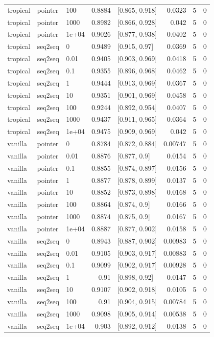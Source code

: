 \documentclass[10pt]{article}
\begin{document}
{\begin{longtable}{lllrlrrr}
tropical & pointer & 100 & 0.8884 & [0.865, 0.918] & 0.0323 & 5 & 0\\
tropical & pointer & 1000 & 0.8982 & [0.866, 0.928] & 0.042 & 5 & 0\\
tropical & pointer & 1e+04 & 0.9026 & [0.877, 0.938] & 0.0402 & 5 & 0\\
tropical & seq2seq & 0 & 0.9489 & [0.915, 0.97] & 0.0369 & 5 & 0\\
tropical & seq2seq & 0.01 & 0.9405 & [0.903, 0.969] & 0.0418 & 5 & 0\\
tropical & seq2seq & 0.1 & 0.9355 & [0.896, 0.968] & 0.0462 & 5 & 0\\
tropical & seq2seq & 1 & 0.9444 & [0.913, 0.969] & 0.0367 & 5 & 0\\
tropical & seq2seq & 10 & 0.9351 & [0.901, 0.969] & 0.0458 & 5 & 0\\
tropical & seq2seq & 100 & 0.9244 & [0.892, 0.954] & 0.0407 & 5 & 0\\
tropical & seq2seq & 1000 & 0.9437 & [0.911, 0.965] & 0.0364 & 5 & 0\\
tropical & seq2seq & 1e+04 & 0.9475 & [0.909, 0.969] & 0.042 & 5 & 0\\
vanilla & pointer & 0 & 0.8784 & [0.872, 0.884] & 0.00747 & 5 & 0\\
vanilla & pointer & 0.01 & 0.8876 & [0.877, 0.9] & 0.0154 & 5 & 0\\
vanilla & pointer & 0.1 & 0.8855 & [0.874, 0.897] & 0.0156 & 5 & 0\\
vanilla & pointer & 1 & 0.8877 & [0.878, 0.899] & 0.0137 & 5 & 0\\
vanilla & pointer & 10 & 0.8852 & [0.873, 0.898] & 0.0168 & 5 & 0\\
vanilla & pointer & 100 & 0.8864 & [0.874, 0.9] & 0.0166 & 5 & 0\\
vanilla & pointer & 1000 & 0.8874 & [0.875, 0.9] & 0.0167 & 5 & 0\\
vanilla & pointer & 1e+04 & 0.8887 & [0.877, 0.902] & 0.0158 & 5 & 0\\
vanilla & seq2seq & 0 & 0.8943 & [0.887, 0.902] & 0.00983 & 5 & 0\\
vanilla & seq2seq & 0.01 & 0.9105 & [0.903, 0.917] & 0.00883 & 5 & 0\\
vanilla & seq2seq & 0.1 & 0.9099 & [0.902, 0.917] & 0.00928 & 5 & 0\\
vanilla & seq2seq & 1 & 0.91 & [0.898, 0.92] & 0.0147 & 5 & 0\\
vanilla & seq2seq & 10 & 0.9107 & [0.902, 0.918] & 0.0105 & 5 & 0\\
vanilla & seq2seq & 100 & 0.91 & [0.904, 0.915] & 0.00784 & 5 & 0\\
vanilla & seq2seq & 1000 & 0.9098 & [0.905, 0.914] & 0.00538 & 5 & 0\\
vanilla & seq2seq & 1e+04 & 0.903 & [0.892, 0.912] & 0.0138 & 5 & 0\\
\bottomrule
\end{longtable}
}
\end{document}
